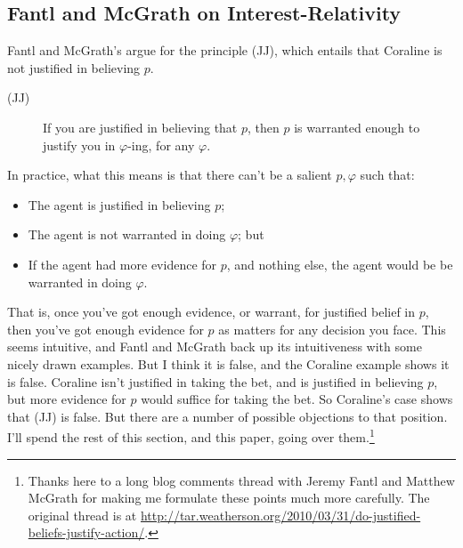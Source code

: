\subsection{Fantl and McGrath on Interest-Relativity}

Fantl and McGrath's argue for the principle (JJ), which entails that Coraline is not justified in believing $p$.

\begin{description}
\item[(JJ)] If you are justified in believing that $p$, then $p$ is warranted enough to justify you in $\varphi$-ing, for any $\varphi$. \cite[99]{FantlMcGrath2009}
\end{description}

\noindent In practice, what this means is that there can't be a salient $p, \varphi$ such that:

\begin{itemize}
\item The agent is justified in believing $p$;
\item The agent is not warranted in doing $\varphi$; but
\item If the agent had more evidence for $p$, and nothing else, the agent would be be warranted in doing $\varphi$.
\end{itemize}

\noindent That is, once you've got enough evidence, or warrant, for justified belief in $p$, then you've got enough evidence for $p$ as matters for any decision you face. This seems intuitive, and Fantl and McGrath back up its intuitiveness with some nicely drawn examples. But I think it is false, and the Coraline example shows it is false. Coraline isn't justified in taking the bet, and is justified in believing $p$, but more evidence for $p$ would suffice for taking the bet. So Coraline's case shows that (JJ) is false. But there are a number of possible objections to that position. I'll spend the rest of this section, and this paper, going over them.\footnote{Thanks here to a long blog comments thread with Jeremy Fantl and Matthew McGrath for making me formulate these points much more carefully. The original thread is at \url{http://tar.weatherson.org/2010/03/31/do-justified-beliefs-justify-action/}.}


